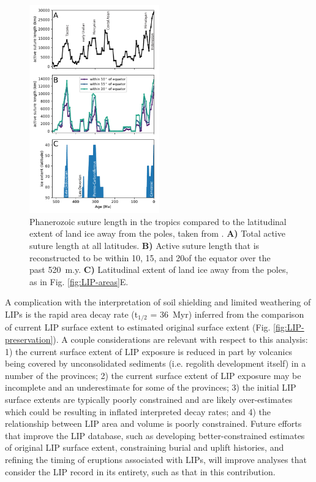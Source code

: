 \begin{figure}[h!]
\begin{center}
	\includegraphics[width=0.5\textwidth]{figures/LIPs/suture-length.pdf}
	\caption[Phanerozoic suture length in the tropics compared to the latitudinal extent of land ice away from the poles.]{Phanerozoic suture length in the tropics compared to the latitudinal extent of land ice away from the poles, taken from \citet{Macdonald2019a}. \textbf{A)} Total active suture length at all latitudes. \textbf{B)} Active suture length that is reconstructed to be within 10\degrees, 15\degrees, and 20\degrees of the equator over the past 520~m.y. \textbf{C)} Latitudinal extent of land ice away from the poles, as in Fig. \ref{fig:LIP-areas}E.}
	\label{fig:suture-length}
\end{center}
\end{figure}

A complication with the interpretation of soil shielding and limited weathering of LIPs is the rapid area decay rate (t$_{1/2}$ = 36~Myr) inferred from the comparison of current LIP surface extent to estimated original surface extent (Fig. \ref{fig:LIP-preservation}). A couple considerations are relevant with respect to this analysis: 1) the current surface extent of LIP exposure is reduced in part by volcanics being covered by unconsolidated sediments (i.e. regolith development itself) in a number of the provinces; 2) the current surface extent of LIP exposure may be incomplete and an underestimate for some of the provinces; 3) the initial LIP surface extents are typically poorly constrained and are likely over-estimates which could be resulting in inflated interpreted decay rates; and 4) the relationship between LIP area and volume is poorly constrained. Future efforts that improve the LIP database, such as developing better-constrained estimates of original LIP surface extent, constraining burial and uplift histories, and refining the timing of eruptions associated with LIPs, will improve analyses that consider the LIP record in its entirety, such as that in this contribution.

